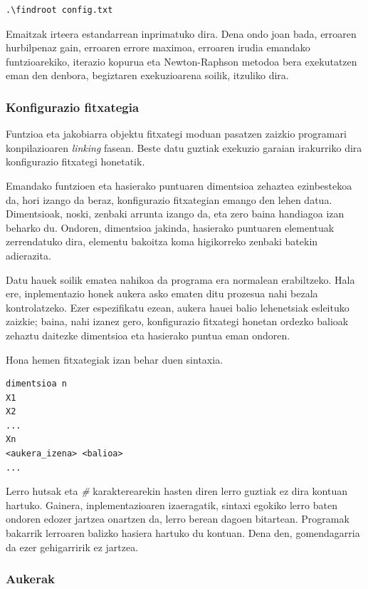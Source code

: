 \documentclass[10pt,a4paper,basque]{article}
\begin{document}
\begin{lstlisting}
.\findroot config.txt
\end{lstlisting}

Emaitzak irteera estandarrean inprimatuko dira. Dena ondo joan bada, erroaren hurbilpenaz gain, erroaren errore maximoa, erroaren irudia emandako funtzioarekiko, iterazio kopurua eta Newton-Raphson metodoa bera exekutatzen eman den denbora, begiztaren exekuzioarena soilik, itzuliko dira.

\subsubsection{Konfigurazio fitxategia}

Funtzioa eta jakobiarra objektu fitxategi moduan pasatzen zaizkio programari konpilazioaren \emph{linking} fasean. Beste datu guztiak exekuzio garaian irakurriko dira konfigurazio fitxategi honetatik.

Emandako funtzioen eta hasierako puntuaren dimentsioa zehaztea ezinbestekoa da, hori izango da beraz, konfigurazio fitxategian emango den lehen datua. Dimentsioak, noski, zenbaki arrunta izango da, eta zero baina handiagoa izan beharko du. Ondoren, dimentsioa jakinda, hasierako puntuaren elementuak zerrendatuko dira, elementu bakoitza koma higikorreko zenbaki batekin adierazita.

Datu hauek soilik ematea nahikoa da programa era normalean erabiltzeko. Hala ere, inplementazio honek aukera asko ematen ditu prozesua nahi bezala kontrolatzeko. Ezer espezifikatu ezean, aukera hauei balio lehenetsiak esleituko zaizkie; baina, nahi izanez gero, konfigurazio fitxategi honetan ordezko balioak zehaztu daitezke dimentsioa eta hasierako puntua eman ondoren.

Hona hemen fitxategiak izan behar duen sintaxia.

\begin{verbatim}
dimentsioa n
X1
X2
...
Xn
<aukera_izena> <balioa>
...
\end{verbatim}

Lerro hutsak eta \emph{\#} karakterearekin hasten diren lerro guztiak ez dira kontuan hartuko. Gainera, inplementazioaren izaeragatik, sintaxi egokiko lerro baten ondoren edozer jartzea onartzen da, lerro berean dagoen bitartean. Programak bakarrik lerroaren balizko hasiera hartuko du kontuan. Dena den, gomendagarria da ezer gehigarririk ez jartzea.

\subsubsection{Aukerak}
\end{document}
